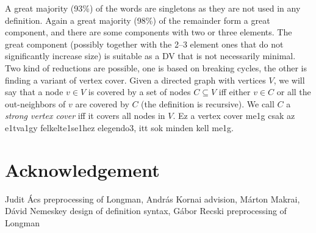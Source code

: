 \documentclass[a4paper,10pt]{article}
\begin{document}
A great majority (93\%) of the words are singletons as they are not used in
any definition. Again a great majority (98\%) of the remainder form a great
component, and there are some components with two or three elements. The great
component (possibly together with the 2--3 element ones that do not
significantly increase size) is suitable as a DV that is not necessarily
minimal. Two kind of reductions are possible, one is based on breaking cycles,
the other is finding a variant of vertex cover. Given a directed graph with
vertices $V$, we will say that a node $v\in V$ is covered by a set of nodes
$C\subseteq V$ iff either $v\in C$ or all the out-neighbors of $v$ are covered
by $C$ (the definition is recursive). We call $C$ a \emph{strong vertex cover}
iff it covers all nodes in $V$. {\color{red} Ez a vertex cover me1g csak az
  e1tva1gy felkelte1se1hez elegendo3, itt sok minden kell me1g.}
\section*{Acknowledgement}
Judit Ács preprocessing of Longman,
András Kornai advision,
Márton Makrai,
Dávid Nemeskey design of definition syntax,
Gábor Recski preprocessing of Longman


\end{document}
